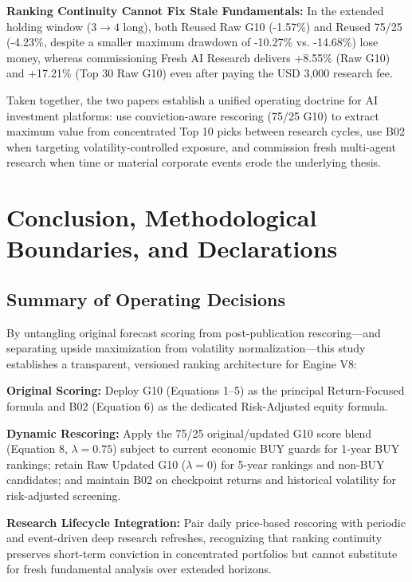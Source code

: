 \documentclass[11pt,a4paper]{article}
\numberwithin{table}{section}
\begin{document}
\textbf{Ranking Continuity Cannot Fix Stale Fundamentals:}  In the extended holding window ($3\to 4\text{ long}$), both Reused Raw G10 (-1.57\%) and Reused 75/25 (-4.23\%, despite a smaller maximum drawdown of -10.27\% vs. -14.68\%) lose money, whereas commissioning Fresh AI Research delivers +8.55\% (Raw G10) and +17.21\% (Top 30 Raw G10) even after paying the USD 3,000 research fee.

Taken together, the two papers establish a unified operating doctrine for AI investment platforms: use conviction-aware rescoring (75/25 G10) to extract maximum value from concentrated Top 10 picks between research cycles, use B02 when targeting volatility-controlled exposure, and commission fresh multi-agent research when time or material corporate events erode the underlying thesis.



\section{Conclusion, Methodological Boundaries, and Declarations}

\subsection{Summary of Operating Decisions}

By untangling original forecast scoring from post-publication rescoring---and separating upside maximization from volatility normalization---this study establishes a transparent, versioned ranking architecture for Engine V8:

\textbf{Original Scoring:}  Deploy G10 (Equations 1--5) as the principal Return-Focused formula and B02 (Equation 6) as the dedicated Risk-Adjusted equity formula.

\textbf{Dynamic Rescoring:}  Apply the 75/25 original/updated G10 score blend (Equation 8, $\lambda = 0.75$) subject to current economic BUY guards for 1-year BUY rankings; retain Raw Updated G10 ($\lambda = 0$) for 5-year rankings and non-BUY candidates; and maintain B02 on checkpoint returns and historical volatility for risk-adjusted screening.

\textbf{Research Lifecycle Integration:}  Pair daily price-based rescoring with periodic and event-driven deep research refreshes, recognizing that ranking continuity preserves short-term conviction in concentrated portfolios but cannot substitute for fresh fundamental analysis over extended horizons.
\end{document}

